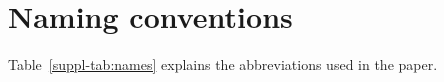 \documentclass{bmcart}
\def\ta{Timed Automaton}
\def\tas{Timed Automata}
\begin{document}
\makeatother




\thispagestyle{empty}
\tableofcontents
\clearpage

\setcounter{page}{1}
\setcounter{section}{0}

\renewcommand\figurename{Figure}
\renewcommand*\thefigure{S\arabic{figure}}
\renewcommand*\thetable{S\arabic{table}}

\def\ta{TA}
\def\tas{TA}




\clearpage
\section{Naming conventions}\label{suppl-sec:names}
Table~\ref{suppl-tab:names} explains the abbreviations used in the paper.
\end{document}
